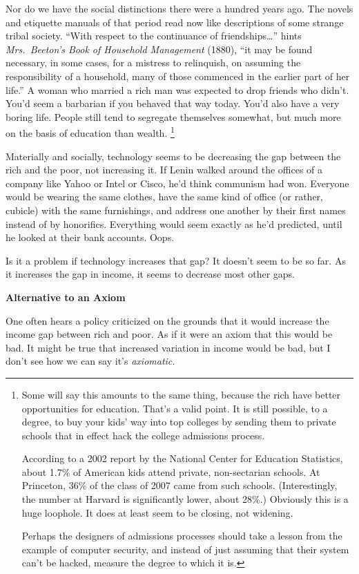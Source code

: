 Nor do we have the social distinctions there were a hundred years ago.
The novels and etiquette manuals of that period read now like
descriptions of some strange tribal society. ``With respect to the
continuance of friendships\ldots{}'' hints \emph{Mrs.~Beeton's Book of
Household Management} (1880), ``it may be found necessary, in some
cases, for a mistress to relinquish, on assuming the responsibility of a
household, many of those commenced in the earlier part of her life.'' A
woman who married a rich man was expected to drop friends who didn't.
You'd seem a barbarian if you behaved that way today. You'd also have a
very boring life. People still tend to segregate themselves somewhat,
but much more on the basis of education than wealth.
\footnote{Some will say this amounts to the same thing, because the rich
have better opportunities for education. That's a valid point. It is
still possible, to a degree, to buy your kids' way into top colleges by
sending them to private schools that in effect hack the college
admissions process.

According to a 2002 report by the National Center for Education
Statistics, about 1.7\% of American kids attend private, non-sectarian
schools. At Princeton, 36\% of the class of 2007 came from such schools.
(Interestingly, the number at Harvard is significantly lower, about
28\%.) Obviously this is a huge loophole. It does at least seem to be
closing, not widening.

Perhaps the designers of admissions processes should take a lesson from
the example of computer security, and instead of just assuming that
their system can't be hacked, measure the degree to which it is.}

Materially and socially, technology seems to be decreasing the gap
between the rich and the poor, not increasing it. If Lenin walked around
the offices of a company like Yahoo or Intel or Cisco, he'd think
communism had won. Everyone would be wearing the same clothes, have the
same kind of office (or rather, cubicle) with the same furnishings, and
address one another by their first names instead of by honorifics.
Everything would seem exactly as he'd predicted, until he looked at
their bank accounts. Oops.

Is it a problem if technology increases that gap? It doesn't seem to be
so far. As it increases the gap in income, it seems to decrease most
other gaps.

\textbf{Alternative to an Axiom}

One often hears a policy criticized on the grounds that it would
increase the income gap between rich and poor. As if it were an axiom
that this would be bad. It might be true that increased variation in
income would be bad, but I don't see how we can say it's
\emph{axiomatic.}


